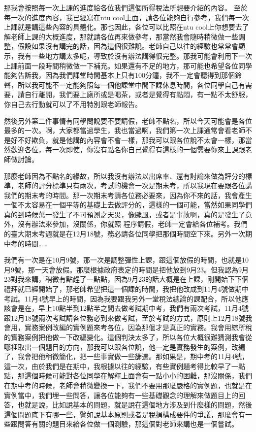\documentclass[oneside,sub3section]{ctexbook}
\begin{document}
那我會按照每一次上課的進度給各位我們這個所得稅法所想要介紹的內容。
至於每一次的進度內容，我已經寫在ntu cool上面，請各位能夠自行參考，我們每一次上課就是講這些內容的具體化。那也因此，各位可以比照在ntu cool上你想要去了解老師上課的大概進度，那就請各位再來做參考，那當然我會隨時稍微做一些調整，假設如果沒有講完的話，因為這個很難說。老師自己以往的經驗也常常會顯示，我有一些地方講太多呢，導致於沒有辦法講得很完整。那我可能會利用下一次上課前面一段時間稍微做一下補充。如果還有不足的地方，那可能也希望各位同學能夠告訴我，因為我們課堂時間基本上只有100分鐘，我不一定會聽得到那個鈴聲，所以我可能不一定能夠照每一個他課堂中間下課休息時間，各位同學自己有需要，請自行離開，我們要上廁所或是喝茶，或者是覺得有點悶，有一點不太舒服，你自己去行動就可以了不用特別跟老師報告。

然後另外第二件事情有同學問說要不要請假，老師不點名，所以今天可能會是各位最多的一次。啊，大家都當過學生，我也當過啊，我們第一次上課通常會看老師不是好不好欺負，就是他講的內容會不會一樣，那我可以跟各位說不太會一樣，那當然歡迎各位，每一次即使，你沒有點名你自己覺得有這樣的一個需要你來上課跟老師做討論。

那麼老師因為不點名的緣故，所以我沒有辦法以出席率、還有討論來做為評分的標準，老師的評分標準只有兩次，考試的機會一次是期末考，所以我現在要跟各位講我們的期末考的時間。那一次期末考請各位務必要來，因為你不來的話，我會產生一個不太容易在一個平等的基礎上去做評分的，這樣的一個可能，當然如果同學們真的到時候萬一發生了不可預測之天災，像颱風，或者是事故啊，真的是發生了意外，沒有辦法來參加，沒關係，你就照 程序請假，老師一定會給各位補考。我們的臺大期末考週就是在12月18號，務必請各位同學把那個時間空下來。另外一次期中考的時間\ldots\ldots{}

我們有一次是在10月9號，那一次是調整彈性上課，跟這個放假的時間，也就是10月9號，那一天會放假。那麼根據政府表定的時間是把他放到9月23。但我認為9月23對我來講，稍微有點趕了一點點，因為9月23的話大概是在上課，剛開始下下個禮拜就已經開始了，那老師希望把這一個課的時間，我把他改成到11月4號做期中考試。11月4號早上的時間，因為我要跟我另外一堂稅法總論的課配合，所以他應該會是在，早上10點半到12點半之間去做考試期中考，我們有兩次考試，11月4號跟12月18號兩次考試請各位務必到來做考試，至於考試的方式，原則上12月18號我會用，實務案例改編的實例題來考各位，因為那個才是真正的實務。我會用綜所稅的實務案例把他做一下改編變化。這個判決太多了，所以各位大概很難猜測我會從哪裡取出一個題目的方向，那我可以跟各位說，他一定是實務發生的案例，改編了，我會把他稍微簡化，把一些事實做一些篩選。那如果是，期中考的11月4號，這一次，由於我們是在期中，我根據以往的經驗，有些實例題考得比較早了一點點，那這個時候可能對各位同學在解釋上面會有一點小小的困難，那沒關係，我們在期中考的時候，老師會稍微變換一下，我們不要用那麼嚴格的實例題，也就是在實例當中，我們埋一些問答，讓各位能夠有一些基礎觀念的理解來做題目上的回答，也就是說，比如說基本的問題，就是說在這個地方涉及到什麼樣的問題，然後這個問題底下有哪一些，譬如說基本原則或者是稅捐構成要件的爭議，那麼會有一些跟問答有關的題目來給各位做一個測驗，那這個對老師來講也是一個嘗試。
\end{document}
